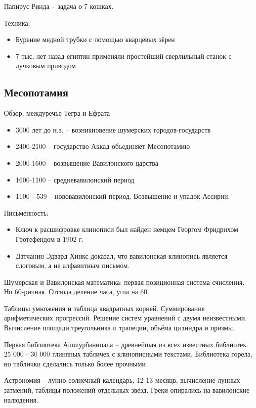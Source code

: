 \documentclass{book}
\theoremstyle{definition}
\begin{document}
   Папирус Ринда -- задача о 7 кошках.

   Техника:
   \begin{itemize}
       \item Бурение медной трубки с помощью кварцевых зёрен
       \item 7 тыс. лет назад египтян применяли простейший сверлильный станок с лучковым приводом.
   \end{itemize}

   \subsection{Месопотамия}

   Обзор: междуречье Тегра и Ефрата
   \begin{itemize}
       \item 3000 лет до н.э. -- возникновение шумерских городов-государств
       \item 2400-2100 -- государство Аккад объединяет Месопотамию
       \item 2000-1600 -- возвышение Вавилонского царства
       \item 1600-1100 -- средневавилонский период
       \item 1100 - 539 -- нововавилонский период. Возвышение и упадок Ассирии.
   \end{itemize}

   Письменность:
   \begin{itemize}
       \item  Ключ к расшифровке клинописи был найден немцем Георгом Фридрихом Гротефендом в 1902 г.
       \item Датчанин Эдвард Хинкс доказал, что вавилонская клинопись является слоговым, а не алфавитным письмом.
   \end{itemize}

   Шумерская и Вавилонская математика: первая позиционная система счисления. Но 60-ричная. Отсюда деление часа, угла на 60.

   Таблицы умножения и таблица квадратных корней. Суммирование арифметических прогрессий. Решение систем уравнений с двумя неизвестными. Вычисление площади треугольника и трапеции, объёма цилиндра и призмы.

   Первая библиотека Ашшурбанипала -- древнейшая из всех известных библиотек. 25 000 - 30 000 глиняных табличек с клинописными текстами. Библиотека горела, но таблички сделались только более прочными

   Астрономия -- лунно-солнечный календарь, 12-13 месяцв, вычисление лунных затмений, таблицы положений отдельных звёзд. Греки опирались на вавилонские налюдения.
\end{document}
